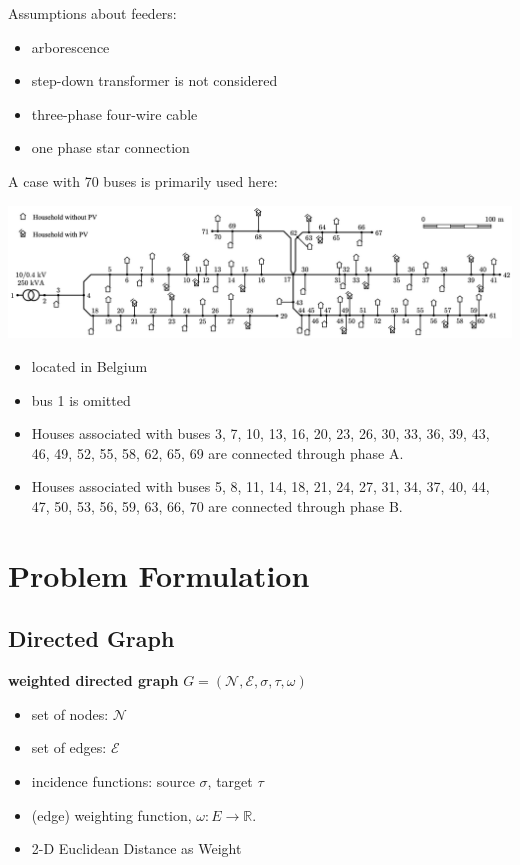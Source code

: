 \documentclass[
]{book}
\providecommand{\tightlist}{%
  \setlength{\itemsep}{0pt}\setlength{\parskip}{0pt}}
\begin{document}
Assumptions about feeders:

\begin{itemize}
\tightlist
\item
  arborescence
\item
  step-down transformer is not considered
\item
  three-phase four-wire cable
\item
  one phase star connection
\end{itemize}

A case with 70 buses is primarily used here:

\includegraphics{Pictures/case70true.png}

\begin{itemize}
\tightlist
\item
  located in Belgium
\item
  bus 1 is omitted
\item
  Houses associated with buses 3, 7, 10, 13, 16, 20, 23, 26, 30, 33, 36, 39,
  43, 46, 49, 52, 55, 58, 62, 65, 69 are connected through phase A.
\item
  Houses associated with buses 5, 8, 11, 14, 18, 21, 24, 27, 31, 34, 37, 40,
  44, 47, 50, 53, 56, 59, 63, 66, 70 are connected through phase B.
\end{itemize}

\hypertarget{problem-formulation}{%
\chapter{Problem Formulation}\label{problem-formulation}}

\hypertarget{directed-graph}{%
\section{Directed Graph}\label{directed-graph}}

\textbf{weighted directed graph}
\(G = (\mathcal{N}, \mathcal{E}, \sigma, \tau, \omega)\)

\begin{itemize}
\tightlist
\item
  set of nodes: \(\mathcal{N}\)
\item
  set of edges: \(\mathcal{E}\)
\item
  incidence functions: source \(\sigma\), target \(\tau\)
\item
  (edge) weighting function, \(\omega: E \rightarrow \mathbb{R}\).
\item
  2-D Euclidean Distance as Weight
\end{itemize}
\end{document}
